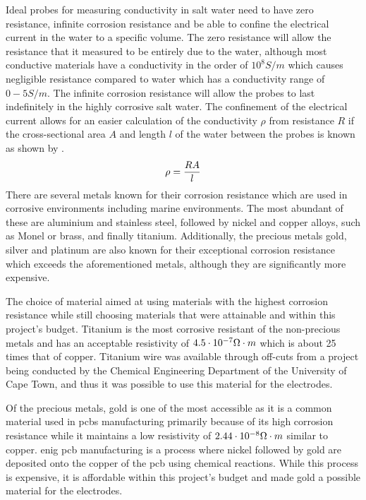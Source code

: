 Ideal probes for measuring conductivity in salt water need to have zero resistance, infinite corrosion resistance and be able to confine the electrical current in the water to a specific volume.
The zero resistance will allow the resistance that it measured to be entirely due to the water, although most conductive materials have a conductivity in the order of $10^8 S/m$ which causes negligible resistance compared to water which has a conductivity range of $0-5 S/m$. %
The infinite corrosion resistance will allow the probes to last indefinitely in the highly corrosive salt water.
The confinement of the electrical current allows for an easier calculation of the conductivity $\rho$ from resistance $R$ if the cross-sectional area $A$ and length $l$ of the water between the probes is known as shown by .
\begin{equation}
    \rho = \frac{\displaystyle RA}{\displaystyle l}
    \label{eqn:conductivity-from-resistance}
\end{equation}
There are several metals known for their corrosion resistance which are used in corrosive environments including marine environments.
The most abundant of these are aluminium and stainless steel, followed by nickel and copper alloys, such as Monel or brass, and finally titanium.
Additionally, the precious metals gold, silver and platinum are also known for their exceptional corrosion resistance which exceeds the aforementioned metals, although they are significantly more expensive.

The choice of material aimed at using materials with the highest corrosion resistance while still choosing materials that were attainable and within this project's budget.
Titanium is the most corrosive resistant of the non-precious metals and has an acceptable resistivity of $4.5\cdot10^{-7}\Omega\cdot m$ which is about 25 times that of copper.
Titanium wire was available through off-cuts from a project being conducted by the Chemical Engineering Department of the University of Cape Town, and thus it was possible to use this material for the electrodes.

Of the precious metals, gold is one of the most accessible as it is a common material used in \glspl{pcb} manufacturing primarily because of its high corrosion resistance while it maintains a low resistivity of $2.44\cdot10^{-8}\Omega\cdot m$ similar to copper.
\gls{enig} \gls{pcb} manufacturing is a process where nickel followed by gold are deposited onto the copper of the \gls{pcb} using chemical reactions.
While this process is expensive, it is affordable within this project's budget and made gold a possible material for the electrodes.

